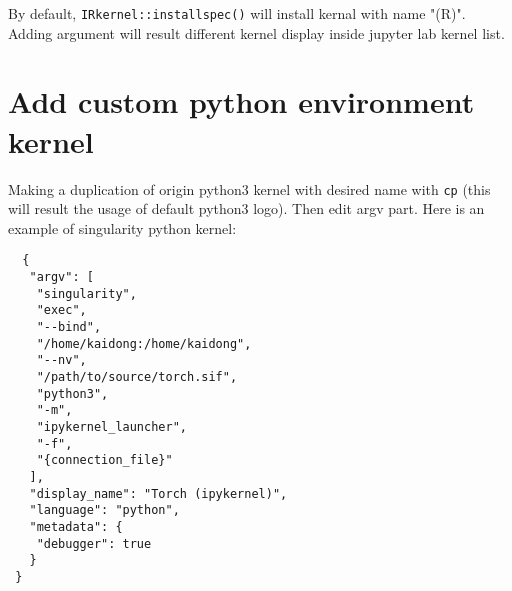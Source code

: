By default, \texttt{IRkernel::installspec()} will install kernal with 
name "\rm(R)". Adding argument will result different kernel display inside 
jupyter lab kernel list.

\section{Add custom python environment kernel}

Making a duplication of origin python3 kernel with desired name with 
\texttt{cp} (this will result the usage of default python3 logo).  
Then edit argv part. Here is an example of singularity python kernel:

\begin{verbatim}
  {
   "argv": [
    "singularity",
    "exec",
    "--bind",
    "/home/kaidong:/home/kaidong",
    "--nv",
    "/path/to/source/torch.sif",
    "python3",
    "-m",
    "ipykernel_launcher",
    "-f",
    "{connection_file}"
   ],
   "display_name": "Torch (ipykernel)",
   "language": "python",
   "metadata": {
    "debugger": true
   }
 }
\end{verbatim}
